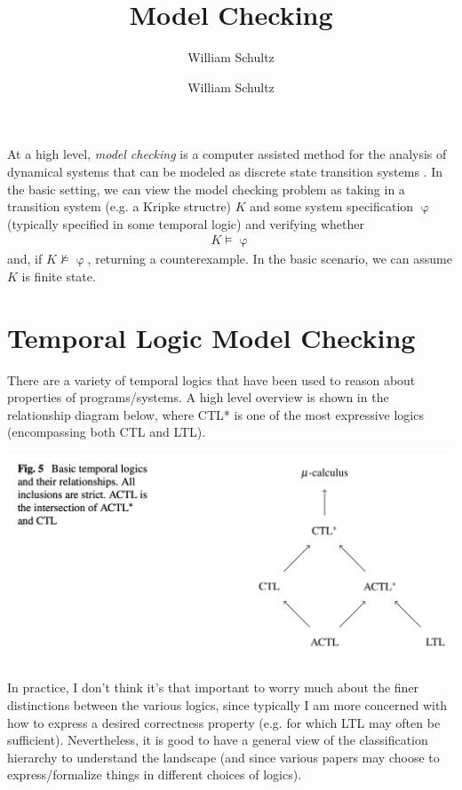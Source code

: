 \documentclass[10pt,a4paper]{article}
\author{William Schultz}
\begin{document}
\title{Model Checking}
\author{William Schultz}
\maketitle

At a high level, \textit{model checking} is a computer assisted method for the analysis of dynamical systems that can be modeled as discrete state transition systems \cite{Clarke2018ch1}. In the basic setting, we can view the model checking problem as taking in a transition system (e.g. a Kripke structre) $K$ and some system specification $\upvarphi$ (typically specified in some temporal logic)  and verifying whether 
\begin{align*}
    K \vDash \upvarphi
\end{align*}
and, if $K \nvDash \upvarphi$, returning a counterexample. In the basic scenario, we can assume $K$ is finite state.

\section{Temporal Logic Model Checking}

There are a variety of temporal logics that have been used to reason about properties of programs/systems. A high level overview is shown in the relationship diagram below, where CTL* is one of the most expressive logics (encompassing both CTL and LTL).
\begin{center}
    \includegraphics[scale=0.3]{diagrams/temp-logics.png}
\end{center}
In practice, I don't think it's that important to worry much about the finer distinctions between the various logics, since typically I am more concerned with how to express a desired correctness property (e.g. for which LTL may often be sufficient). Nevertheless, it is good to have a general view of the classification hierarchy to understand the landscape (and since various papers may choose to express/formalize things in different choices of logics).
\end{document}
